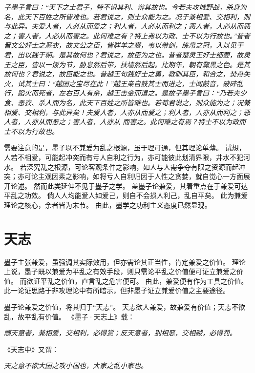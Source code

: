 \documentclass[11pt]{article}
\begin{document}
\textit{子墨子言曰：“天下之士君子，特不识其利、辩其故也。今若夫攻城野战，杀身为名，此天下百姓之所皆难也。若君说之，则士众能为之。况于兼相爱、交相利，则与此异。夫爱人者，人必从而爱之；利人者，人必从而利之；恶人者，人必从而恶之；害人者，人必从而害之。此何难之有？特上弗以为政、士不以为行故也。”昔者晋文公好士之恶衣，故文公之臣，皆牂羊之裘，韦以带剑，练帛之冠，入以见于君，出以践于朝。是其故何也？君说之，故臣为之也。昔者楚灵王好士细要，故灵王之臣，皆以一饭为节，胁息然后带，扶墙然后起。比期年，朝有黧黑之色。是其故何也？君说之，故臣能之也。昔越王句践好士之勇，教驯其臣，和合之，焚舟失火，试其士曰：“越国之宝尽在此！”越王亲自鼓其士而进之，士闻鼓音，破碎乱行，蹈火而死者，左右百人有余，越王击金而退之。是故子墨子言曰：“乃若夫少食、恶衣、杀人而为名，此天下百姓之所皆难也。若苟君说之，则众能为之；况兼相爱、交相利，与此异矣！夫爱人者，人亦从而爱之；利人者，人亦从而利之；恶人者，人亦从而恶之；害人者，人亦从 而害之。此何难之有焉？特士不以为政而士不以为行故也。}

\newline

需要注意的是，墨子以不兼爱为乱之根源，虽于理可通，但其理论单薄。
试想，人若不相爱，可能起冲突而有亏人自利之行为，亦可能彼此划清界限，井水不犯河水。
若深究乱之根源，可论客观条件之影响，如人与人需争夺有限之资源而起冲突；亦可论主观因素之影响，如将亏人自利归因于人性之贪婪，就自觉心一方面展开论述。
然而此类延伸不见于墨子之学。
盖墨子论兼爱，其着重点在于兼爱可达平乱之功效。
倘人人均能爱人如爱己，则自不会损人利己，乱自平矣。
此为兼爱理论之核心，余者皆为末节。
由此，墨学之功利主义态度已然显现。

\section{天志}
墨子主张兼爱，虽强调其实际效用，但亦需论其正当性，肯定兼爱之价值。
理论上说，墨子既以兼爱为平乱之有效手段，则只需论平乱之价值便可证立兼爱之价值。
而欲证平乱之价值，直言乱之危害便可。
由此，兼爱便有作为工具之价值。
此一论证思路于非攻理论中有所暗示，但非墨子证立兼爱价值之主要途径。

\newline

墨子论兼爱之价值，将其归于“天志”。
天志欲人兼爱，故兼爱有价值；天志不欲乱，故平乱有价值。
《墨子·天志上》载：

\textit{顺天意者，兼相爱，交相利，必得赏；反天意者，别相恶，交相贼，必得罚。}

《天志中》又谓：

\textit{天之意不欲大国之攻小国也，大家之乱小家也。}
\end{document}
